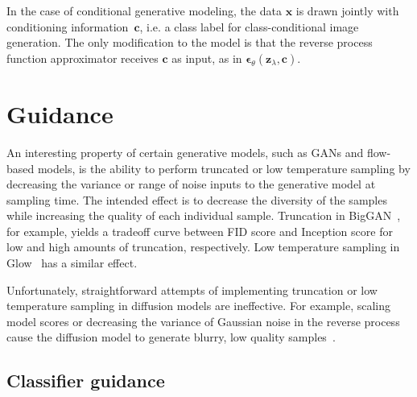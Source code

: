 \documentclass{article} %
\newcommand{\bc}{\mathbf{c}}
\newcommand{\bx}{\mathbf{x}}
\newcommand{\bz}{\mathbf{z}}
\newcommand{\bepsilon}{{\boldsymbol{\epsilon}}}
\begin{document}
In the case of conditional generative modeling, the data $\bx$ is drawn jointly with conditioning information~$\bc$, i.e. a class label for class-conditional image generation. The only modification to the model is that the reverse process function approximator receives $\bc$ as input, as in $\bepsilon_\theta(\bz_\lambda, \bc)$.

\section{Guidance}
\label{sec:guidance}

An interesting property of certain generative models, such as GANs and flow-based models, is the ability to perform truncated or low temperature sampling by decreasing the variance or range of noise inputs to the generative model at sampling time. The intended effect is to decrease the diversity of the samples while increasing the quality of each individual sample. Truncation in BigGAN~\citep{brock2018large}, for example, yields a tradeoff curve between FID score and Inception score for low and high amounts of truncation, respectively. Low temperature sampling in Glow~\citep{kingma2018glow} has a similar effect.

Unfortunately, straightforward attempts of implementing truncation or low temperature sampling in diffusion models are ineffective. For example, scaling model scores or decreasing the variance of Gaussian noise in the reverse process cause the diffusion model to generate blurry, low quality samples~\citep{dhariwal2021diffusion}.

\subsection{Classifier guidance}
\end{document}
